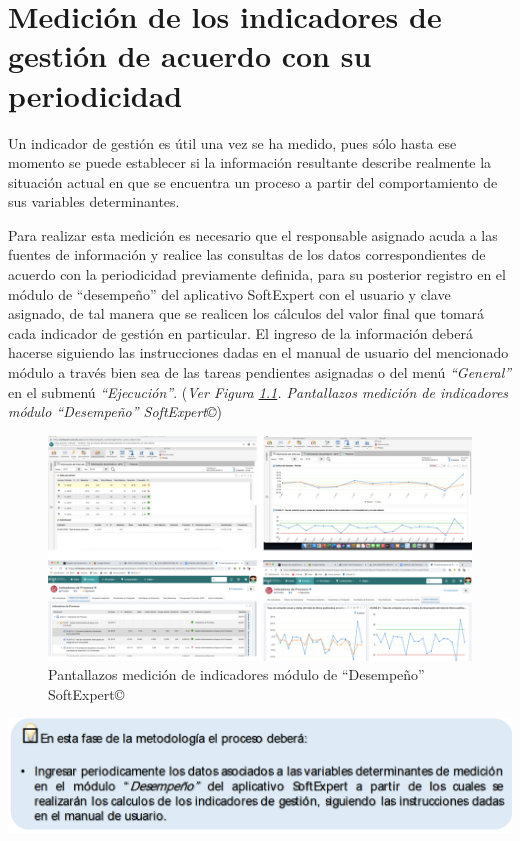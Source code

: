 \documentclass[
]{book}
\begin{document}
\hypertarget{mediciuxf3n-de-los-indicadores-de-gestiuxf3n-de-acuerdo-con-su-periodicidad}{%
\chapter{Medición de los indicadores de gestión de acuerdo con su periodicidad}\label{mediciuxf3n-de-los-indicadores-de-gestiuxf3n-de-acuerdo-con-su-periodicidad}}

Un indicador de gestión es útil una vez se ha medido, pues sólo hasta ese momento se puede establecer si la información resultante describe realmente la situación actual en que se encuentra un proceso a partir del comportamiento de sus variables determinantes.

Para realizar esta medición es necesario que el responsable asignado acuda a las fuentes de información y realice las consultas de los datos correspondientes de acuerdo con la periodicidad previamente definida, para su posterior registro en el módulo de ``desempeño'' del aplicativo SoftExpert con el usuario y clave asignado, de tal manera que se realicen los cálculos del valor final que tomará cada indicador de gestión en particular. El ingreso de la información deberá hacerse siguiendo las instrucciones dadas en el manual de usuario del mencionado módulo a través bien sea de las tareas pendientes asignadas o del menú \emph{``General''} en el submenú \emph{``Ejecución''}. (\emph{Ver Figura \ref{fig:figura19}. Pantallazos medición de indicadores módulo ``Desempeño'' SoftExpert©})

\begin{figure}

{\centering \includegraphics[width=0.8\linewidth]{Imagenes/figura_19} 

}

\caption{Pantallazos medición de indicadores módulo de “Desempeño” SoftExpert©}\label{fig:figura19}
\end{figure}

\begin{center}\includegraphics[width=0.8\linewidth]{Imagenes/texto_7} \end{center}
\end{document}
